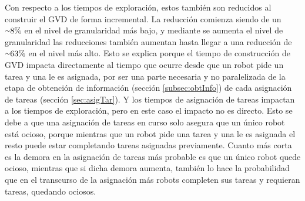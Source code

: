 
Con respecto a los tiempos de exploración, estos también son reducidos al
construir el GVD de forma incremental. La reducción comienza siendo de un
${\smallsim}8\%$ en el nivel de granularidad más bajo, y mediante se aumenta el
nivel de granularidad las reducciones también aumentan hasta llegar a una
reducción de ${\smallsim}63\%$ en el nivel más alto. Esto se explica porque el
tiempo de construcción de GVD impacta directamente al tiempo que ocurre desde
que un robot pide un tarea y una le es asignada, por ser una parte necesaria y
no paralelizada de la etapa de obtención de información (sección
\ref{subsec:obtInfo}) de cada asignación de tareas (sección \ref{sec:asigTar}).
Y los tiempos de asignación de tareas impactan a los tiempos de exploración,
pero en este caso el impacto no es directo. Esto se debe a que una asignación
de tareas en curso solo asegura que un único robot está ocioso, porque
mientras que un robot pide una tarea y una le es asignada el resto puede estar
completando tareas asignadas previamente. Cuanto más corta es la demora en la
asignación de tareas más probable es que un único robot quede ocioso, mientras
que si dicha demora aumenta, también lo hace la probabilidad que en el
transcurso de la asignación más robots completen sus tareas y requieran tareas,
quedando ociosos. 

